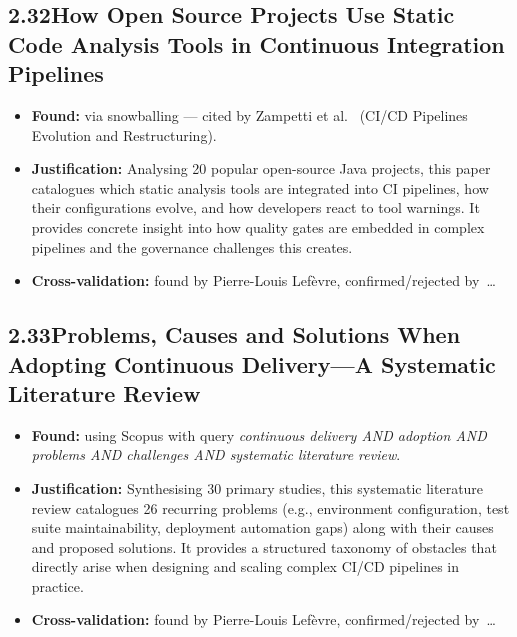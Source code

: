 \documentclass[a4paper,11pt]{article}
\begin{document}
\subsection*{2.32\quad How Open Source Projects Use Static Code Analysis Tools in Continuous Integration Pipelines~\cite{zampetti2017static}}

\begin{itemize}[leftmargin=1.5em]
  \item \textbf{Found:} via snowballing --- cited by Zampetti et al.~\cite{zampetti2021cicd} (CI/CD Pipelines Evolution and Restructuring).
  \item \textbf{Justification:} Analysing 20 popular open-source Java projects, this paper catalogues which static analysis tools are integrated into CI pipelines, how their configurations evolve, and how developers react to tool warnings. It provides concrete insight into how quality gates are embedded in complex pipelines and the governance challenges this creates.
  \item \textbf{Cross-validation:} found by Pierre-Louis Lef\`evre, confirmed/rejected by~\ldots
\end{itemize}

\subsection*{2.33\quad Problems, Causes and Solutions When Adopting Continuous Delivery---A Systematic Literature Review~\cite{laukkanen2017problems}}

\begin{itemize}[leftmargin=1.5em]
  \item \textbf{Found:} using Scopus with query \textit{continuous delivery AND adoption AND problems AND challenges AND systematic literature review}.
  \item \textbf{Justification:} Synthesising 30 primary studies, this systematic literature review catalogues 26 recurring problems (e.g., environment configuration, test suite maintainability, deployment automation gaps) along with their causes and proposed solutions. It provides a structured taxonomy of obstacles that directly arise when designing and scaling complex CI/CD pipelines in practice.
  \item \textbf{Cross-validation:} found by Pierre-Louis Lef\`evre, confirmed/rejected by~\ldots
\end{itemize}
\end{document}

